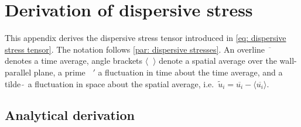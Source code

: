 
\chapter{Derivation of dispersive stress}\label{apx: derivation of dispersive stress}

This appendix derives the dispersive stress tensor introduced in \autoref{eq: dispersive stress tensor}.
The notation follows \autoref{par: dispersive stresses}.
An overline $\overline{ \phantom{u} }$ denotes a time average, angle brackets $\langle \phantom{u} \rangle$ denote a spatial average over the wall-parallel plane, a prime $ \phantom{u}'$ a fluctuation in time about the time average, and a tilde $\tilde{ \ }$ a fluctuation in space about the spatial average, i.e.\ $\tilde{u}_i = \overline{u_i} - \langle \overline{u_i}\rangle$.

\section{Analytical derivation}

